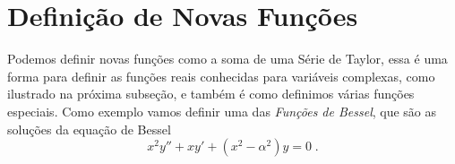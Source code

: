 \section{Definição de Novas Funções}

Podemos definir novas funções como a soma de uma Série de Taylor, essa é uma
forma para definir as funções reais conhecidas para variáveis complexas,
como ilustrado na próxima subseção,
e também é como definimos várias funções especiais. Como exemplo vamos
definir uma das \emph{Funções de Bessel},
que são as soluções da equação de Bessel
\begin{equation}
  \label{eq:bessel}
  x^2 y'' + xy' + (x^2-\alpha^2)y = 0 \;.
\end{equation}

